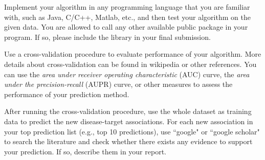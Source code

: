 \documentclass[12pt]{article}
\begin{document}




Implement your algorithm in any programming language that you are
familiar with, such as Java, C/C++, Matlab, etc., and then test
your algorithm on the given data. You are allowed to call any
other available public package in your program. If so, please
include the library in your final submission.


Use a cross-validation procedure to evaluate performance of your
algorithm. More details about cross-validation can be found in
wikipedia or other references. You can use the \emph{area under
receiver operating characteristic} (AUC) curve, the \emph{area
under the precision-recall} (AUPR) curve, or other measures to
assess the performance of your prediction method.

After running the cross-validation procedure, use the whole
dataset as training data to predict the new disease-target
associations. For each new association in your top prediction list
(e.g., top 10 predictions), use ``google" or ``google scholar" to
search the literature and check whether there exists any evidence
to support your prediction. If so, describe them in your report.
\end{document}
